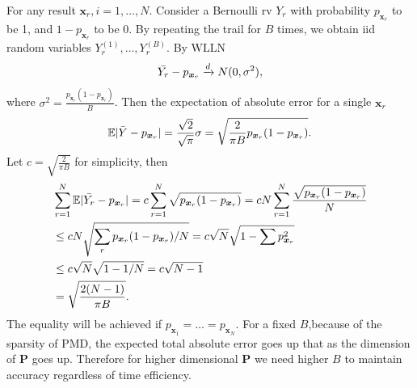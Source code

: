 \documentclass[12pt]{article}
\newcommand{\EE}{\mathbb{E}}
\newcommand{\Pmat}{\mathbf{P}}
\newcommand{\PMD}{\textrm{PMD}}
\newcommand{\xvec}{\boldsymbol{x}}
\begin{document}
For any result $\xvec_r,i=1,\dots,N$. Consider a Bernoulli rv $Y_r$ with probability $p_{\xvec_r}$ to be 1, and $1-p_{\xvec_r}$ to be 0. By repeating the trail for $B$ times, we obtain iid random variables $Y_r^{(1)},\dots,Y_r^{(B)}$. By $\textrm{WLLN}$
\begin{equation*}
    \Bar{Y_r}-p_{\xvec_r} \xrightarrow{d} N(0,\sigma^2),
\end{equation*}
where $\sigma^2 = \frac{p_{\xvec_r}(1-p_{\xvec_r})}{B}$. Then the expectation of absolute error for a single $\xvec_r$
\begin{equation*}
    \EE |\Bar{Y}-p_{\xvec_r}| = \frac{\sqrt{2}}{\sqrt{\pi}}\sigma = \sqrt{\frac{2}{\pi B}p_{\xvec_r}(1-p_{\xvec_r})}.
\end{equation*}
Let $c = \sqrt{\frac{2}{\pi B}}$ for simplicity, then
\begin{align*}
    & \sum_{r=1}^{N}\EE |\Bar{Y_r}-p_{\xvec_r}| = c \sum_{r=1}^{N} \sqrt{p_{\xvec_r}(1-p_{\xvec_r})}  = c N \sum_{r=1}^{N}\frac{\sqrt{p_{\xvec_r}(1-p_{\xvec_r})}}{N} \\
    & \leq c N \sqrt{\sum_{r}p_{\xvec_r}(1-p_{\xvec_r})/N} = c \sqrt{N} \sqrt{1-\sum p_{\xvec_{r}}^2}\\ &\leq c \sqrt{N} \sqrt{1-1/N} = c\sqrt{N-1}\\
    & = \sqrt{\frac{2(N-1)}{\pi B}}.
\end{align*}
The equality will be achieved if $p_{\xvec_1} = \dots = p_{\xvec_N}$. For a fixed $B$,because of the sparsity of $\PMD$, the expected total absolute error goes up that as the dimension of $\Pmat$ goes up. Therefore for higher dimensional $\Pmat$ we need higher $B$ to maintain accuracy regardless of time efficiency.

\end{document}
